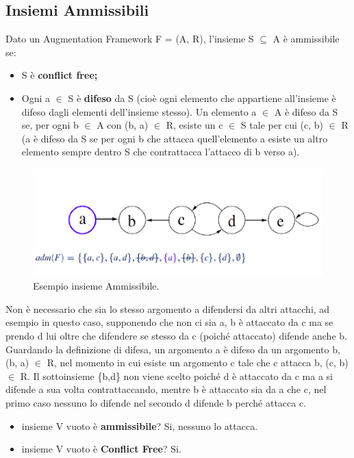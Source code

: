 \subsection{Insiemi Ammissibili}
Dato un Augmentation Framework F = (A, R), l'insieme S $\subseteq$ A è ammissibile se:
\begin{itemize}
    \item S è \textbf{conflict free;}
    \item Ogni a $\in$ S è \textbf{difeso} da S (cioè ogni elemento che appartiene all'insieme è difeso dagli elementi dell'insieme stesso). Un elemento a $\in$ A è difeso da S se, per ogni b $\in$ A con (b, a) $\in$ R, esiste un c $\in$ S tale per cui (c, b) $\in$ R (a è difeso da S se per ogni b che attacca quell'elemento a esiste un altro elemento sempre dentro S che contrattacca l'attacco di b verso a).
\end{itemize}
\begin{figure}[H]
    \centering
    \includegraphics[width=12cm, keepaspectratio]{img/Cap6/ammissibile.png}
    \caption{Esempio insieme Ammissibile.}
\end{figure}
Non è necessario che sia lo stesso argomento a difendersi da altri attacchi, ad esempio in questo caso, supponendo che non ci sia a, b è attaccato da c ma se prendo d lui oltre che difendere se stesso da c (poiché attaccato) difende anche b. Guardando la definizione di difesa, un argomento a è difeso da un argomento b, (b, a) $\in$ R, nel momento in cui esiste un argomento c tale che c attacca b, (c, b) $\in$ R. Il sottoinsieme \{b,d\} non viene scelto poiché d è attaccato da c ma a si difende a sua volta contrattaccando, mentre b è attaccato sia da a che c, nel primo caso nessuno lo difende nel secondo d difende b perché attacca c.
\begin{itemize}
    \item insieme V vuoto è \textbf{ammissibile}? Si, nessuno lo attacca.
    \item insieme V vuoto è \textbf{Conflict Free}? Si.
\end{itemize}

